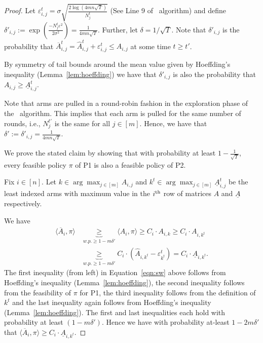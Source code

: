 \begin{proof}
Let $\varepsilon_{i,j}^t = \sigma \sqrt{\frac{2 \log(4mn\sqrt{T})}{N_j^t}} $ (See Line 9 of \ouralgo\ algorithm) and define   
 $ \delta'_{i,j} := \exp\left(\frac{-N_j^t \varepsilon^2}{2\sigma^2}\right)  = \frac{1}{4mn\sqrt{T}}$. Further,  let $\delta = 1/\sqrt{T}$.  Note that $\delta'_{i,j}$ is the  probability that $\overline{A}_{i,j}^t = \widehat{A}_{i,j}^t + \varepsilon_{i,j}^t \leq A_{i,j}$ at some time $t \geq t'$. 
 
 By symmetry of tail bounds  around the mean value  given by Hoeffding's inequality (Lemma~\ref{lem:hoeffding}) we have that  $ \delta'_{i,j} $ is also the  probability that $A_{i,j} \geq \underline{A}_{i,j}^t $.    
 
Note that arms are pulled in a round-robin fashion in the exploration phase of the \ouralgo\ algorithm. This implies that   each arm is pulled for the same number of rounds, i.e., $N_j^{t'}$ is the same for all $j \in [m]$.   Hence, we have that $\delta' := \delta'_{i,j} = \frac{1}{4mn\sqrt{T}} $. %
 
 We prove the stated claim by showing that  with probability at least $1- \frac{1}{\sqrt{T}}$,  every feasible policy $\pi$ of P1 is also  a feasible policy of P2. %
 
 Fix $i \in [n]$. Let $k  \in  \arg\max_{j \in [m]} A_{i,j}$ and $ k^t \in   \arg\max_{j \in [m]} \underline{A}_{i,j}^t $ be the least indexed arms with maximum value in the $i^{\textup{th}}$ row of matrices $A$ and $\underline{A}$ respectively. 

 We have   
\begin{align}\label{eqn:sw}
\langle \overline{A}_i,  \pi \rangle &  \underbrace{\geq}_{w.p. \geq 1-m \delta'} \langle  A_i, \pi  \rangle      \geq  C_i \cdot A_{i,k} \geq C_i \cdot  A_{i, k^t} \nonumber  \\  & \underbrace{\geq}_{w.p. \geq 1-m\delta'} C_i \cdot (\widehat{A}_{i,k^t} - \varepsilon_{k^t}^t) = C_i \cdot \underline{A}_{i,k^t}. 
\end{align}
The first inequality (from left) in Equation~\ref{eqn:sw} above  follows from Hoeffding's inequality (Lemma~\ref{lem:hoeffding}), the second inequality follows from the feasibility of $\pi$ for P1, the third inequality follows from the definition of $k^t$ and the last inequality again follows from Hoeffding's inequality (Lemma~\ref{lem:hoeffding}). The first and last inequalities each hold with probability at least $(1-m\delta')$. Hence we have with probability at-least $1-2m\delta'$  that $\langle \overline{A}_i,  \pi \rangle \geq  C_i \cdot \underline{A}_{i,k^t}$.


\end{proof}
